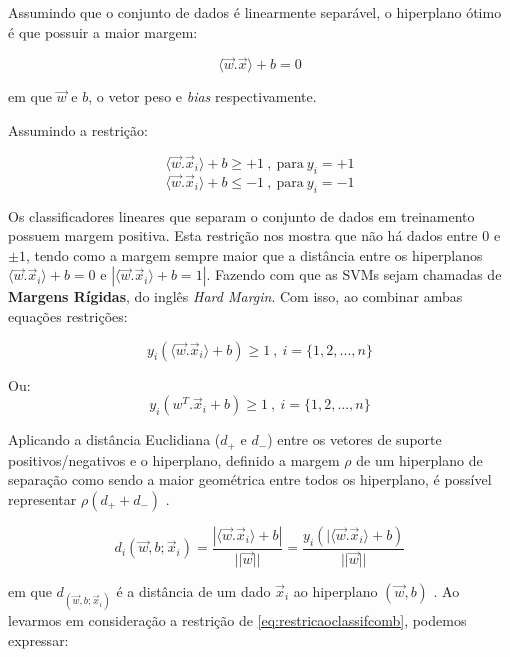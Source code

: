 \documentclass[
]{book}
\begin{document}
Assumindo que o conjunto de dados é linearmente separável, o hiperplano ótimo é que possuir a maior margem:

\begin{equation}
\langle\vec{w}.\vec{x}\rangle+b=0
\label{eq:maiormarg}
\end{equation}

em que \(\vec{w}\) e \(b\), o vetor peso e \emph{bias} respectivamente.

Assumindo a restrição:

\[\langle\vec{w}.\vec{x}_i\rangle+b\geq + 1 \ , \ \mbox{para} \ y_i=+1\]
\begin{equation}
\langle\vec{w}.\vec{x}_i\rangle+b\leq - 1 \ , \ \mbox{para} \ y_i=-1
\label{eq:restricaoclassif}
\end{equation}

Os classificadores lineares que separam o conjunto de dados em treinamento possuem margem positiva. Esta restrição nos mostra que não há dados entre 0 e \(\pm1\), tendo como a margem sempre maior que a distância entre os hiperplanos \(\langle\vec{w}.\vec{x}_i\rangle+b=0\) e \(|\langle\vec{w}.\vec{x}_i\rangle+b= 1|\). Fazendo com que as SVMs sejam chamadas de \textbf{Margens Rígidas}, do inglês \emph{Hard Margin}. Com isso, ao combinar ambas equações restrições:

\begin{equation}
y_i(\langle\vec{w}.\vec{x}_i\rangle+b)\geq  1 \ ,  \ i=\{1,2,...,n\}
\label{eq:restricaoclassifcom}
\end{equation}

Ou:
\begin{equation}
y_i(w^T.\vec{x}_i+b)\geq  1 \ ,  \ i=\{1,2,...,n\}
\label{eq:restricaoclassifcomb}
\end{equation}

Aplicando a distância Euclidiana (\(d_+\) e \(d_-\)) entre os vetores de suporte positivos/negativos e o hiperplano, definido a margem \(\rho\) de um hiperplano de separação como sendo a maior geométrica entre todos os hiperplano, é possível representar \(\rho(d_+ + d_-)\) \citep{gonccalves2015maquina}.

\begin{equation}
d_i(\vec{w},b;\vec{x}_i)=\frac{|\langle\vec{w}.\vec{x}_i\rangle+b|}{||\vec{w}||}=\frac{y_i(|\langle\vec{w}.\vec{x}_i\rangle+b)}{||\vec{w}||}
\label{eq:distanciahip}
\end{equation}

em que \(d_(\vec{w},b;\vec{x}_i)\) é a distância de um dado \(\vec{x}_i\) ao hiperplano \((\vec{w},b)\) \citep{lima2002maquinas}. Ao levarmos em consideração a restrição de \eqref{eq:restricaoclassifcomb}, podemos expressar:
\end{document}
